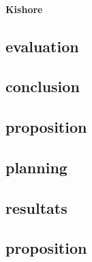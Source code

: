 \paragraph{Kishore}



\subsection {evaluation}


\subsection {conclusion}


\subsection {proposition}



\subsection {planning}


\subsection{resultats}

\subsection{proposition}




